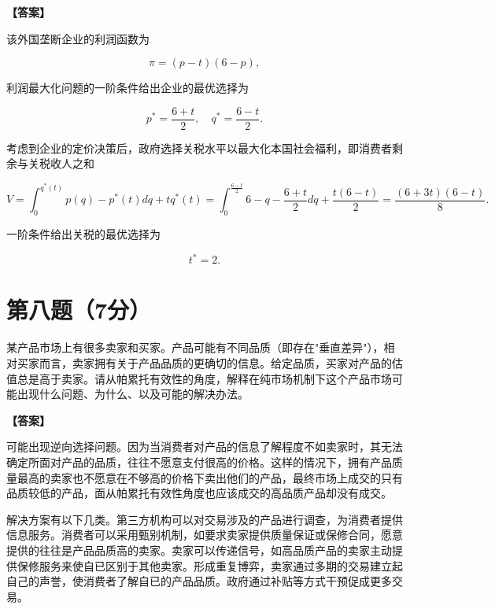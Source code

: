 \documentclass[12pt]{article}
\begin{document}
\noindent\textbf{【答案】}

该外国垄断企业的利润函数为

$$\pi=(p-t)(6-p),$$

利润最大化问题的一阶条件给出企业的最优选择为

$$p^*=\frac{6+t}{2},\quad q^*=\frac{6-t}{2}.$$

考虑到企业的定价决策后，政府选择关税水平以最大化本国社会福利，即消费者剩余与关税收人之和

$$V=\int_{0}^{q^{*}(t)}p(q)-p^{*}(t)dq+tq^{*}(t)=\int_{0}^{\frac{6-t}{2}}6-q-\frac{6+t}{2}dq+\frac{t(6-t)}{2}=\frac{(6+3t)(6-t)}{8}.$$

一阶条件给出关税的最优选择为

$$t^{*}=2.$$

\section*{第八题（7分）}
某产品市场上有很多卖家和买家。产品可能有不同品质（即存在"垂直差异"），相对买家而言，卖家拥有关于产品品质的更确切的信息。给定品质，买家对产品的估值总是高于卖家。请从帕累托有效性的角度，解释在纯市场机制下这个产品市场可能出现什么问题、为什么、以及可能的解决办法。

\noindent\textbf{【答案】}

可能出现逆向选择问题。因为当消费者对产品的信息了解程度不如卖家时，其无法确定所面对产品的品质，往往不愿意支付很高的价格。这样的情况下，拥有产品质量最高的卖家也不愿意在不够高的价格下卖出他们的产品，最终市场上成交的只有品质较低的产品，面从帕累托有效性角度也应该成交的高品质产品却没有成交。

解决方案有以下几类。第三方机构可以对交易涉及的产品进行调查，为消费者提供信息服务。消费者可以采用甄别机制，如要求卖家提供质量保证或保修合同，愿意提供的往往是产品品质高的卖家。卖家可以传递信号，如高品质产品的卖家主动提供保修服务来使自已区别于其他卖家。形成重复博弈，卖家通过多期的交易建立起自己的声誉，使消费者了解自已的产品品质。政府通过补贴等方式干预促成更多交易。
\end{document}
